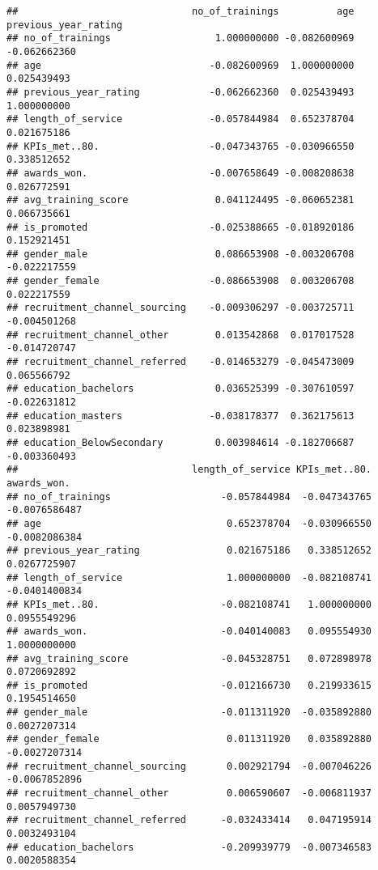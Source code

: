 \documentclass[
]{article}
\begin{document}
\begin{verbatim}
##                              no_of_trainings          age previous_year_rating
## no_of_trainings                  1.000000000 -0.082600969         -0.062662360
## age                             -0.082600969  1.000000000          0.025439493
## previous_year_rating            -0.062662360  0.025439493          1.000000000
## length_of_service               -0.057844984  0.652378704          0.021675186
## KPIs_met..80.                   -0.047343765 -0.030966550          0.338512652
## awards_won.                     -0.007658649 -0.008208638          0.026772591
## avg_training_score               0.041124495 -0.060652381          0.066735661
## is_promoted                     -0.025388665 -0.018920186          0.152921451
## gender_male                      0.086653908 -0.003206708         -0.022217559
## gender_female                   -0.086653908  0.003206708          0.022217559
## recruitment_channel_sourcing    -0.009306297 -0.003725711         -0.004501268
## recruitment_channel_other        0.013542868  0.017017528         -0.014720747
## recruitment_channel_referred    -0.014653279 -0.045473009          0.065566792
## education_bachelors              0.036525399 -0.307610597         -0.022631812
## education_masters               -0.038178377  0.362175613          0.023898981
## education_BelowSecondary         0.003984614 -0.182706687         -0.003360493
##                              length_of_service KPIs_met..80.   awards_won.
## no_of_trainings                   -0.057844984  -0.047343765 -0.0076586487
## age                                0.652378704  -0.030966550 -0.0082086384
## previous_year_rating               0.021675186   0.338512652  0.0267725907
## length_of_service                  1.000000000  -0.082108741 -0.0401400834
## KPIs_met..80.                     -0.082108741   1.000000000  0.0955549296
## awards_won.                       -0.040140083   0.095554930  1.0000000000
## avg_training_score                -0.045328751   0.072898978  0.0720692892
## is_promoted                       -0.012166730   0.219933615  0.1954514650
## gender_male                       -0.011311920  -0.035892880  0.0027207314
## gender_female                      0.011311920   0.035892880 -0.0027207314
## recruitment_channel_sourcing       0.002921794  -0.007046226 -0.0067852896
## recruitment_channel_other          0.006590607  -0.006811937  0.0057949730
## recruitment_channel_referred      -0.032433414   0.047195914  0.0032493104
## education_bachelors               -0.209939779  -0.007346583  0.0020588354

\end{verbatim}
\end{document}
